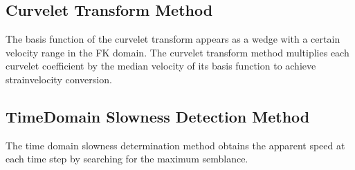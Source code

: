 \documentclass[letterpaper,10pt,english]{sphinxmanual}
\begin{document}
\begin{sphinxVerbatim}[commandchars=\\\{\}]
   
\end{sphinxVerbatim}


\subsection{Curvelet Transform Method}
\label{\detokenize{Strain-velocity Conversion:curvelet-transform-method}}\label{\detokenize{Strain-velocity Conversion:id2}}
\sphinxAtStartPar
The basis function of the curvelet transform appears as a wedge with a certain velocity range in the FK domain. The curvelet transform method multiplies each curvelet coefficient by the median velocity of its basis function to achieve strain\sphinxhyphen{}velocity conversion.

\begin{sphinxVerbatim}[commandchars=\\\{\}]
  
\end{sphinxVerbatim}


\subsection{Time\sphinxhyphen{}Domain Slowness Detection Method}
\label{\detokenize{Strain-velocity Conversion:time-domain-slowness-detection-method}}\label{\detokenize{Strain-velocity Conversion:id3}}
\sphinxAtStartPar
The time domain slowness determination method obtains the apparent speed at each time step by searching for the maximum semblance.

\begin{sphinxVerbatim}[commandchars=\\\{\}]
      
\end{sphinxVerbatim}
\end{document}
